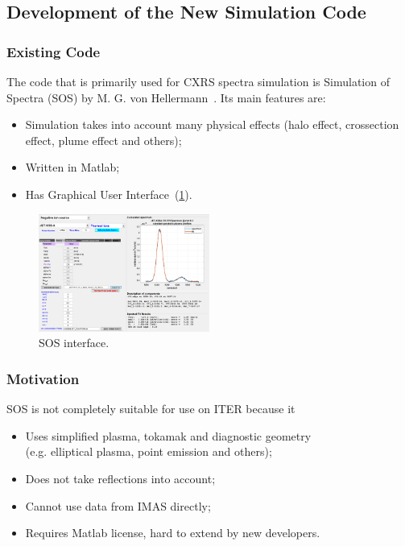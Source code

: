 \documentclass[../main.tex]{subfiles}
\begin{document}

\subsection{Development of the New Simulation Code}

\subsubsection{Existing Code}

The code that is primarily used for CXRS spectra simulation is Simulation of Spectra (SOS) by M. G. von Hellermann~\cite{sos}. Its main features are:

\begin{itemize}
    \item Simulation takes into account many physical effects (halo effect, crossection effect, plume effect and others);
    \item Written in Matlab;
    \item Has Graphical User Interface~(\cref{fig:sos_interface}).
\end{itemize}

\begin{figure}[h!tbp]
    \centering
    \includegraphics[width=0.5\textwidth]{images/sos_interface}
    \caption{SOS interface.}%
    \label{fig:sos_interface}
\end{figure}

\subsubsection{Motivation}

SOS is not completely suitable for use on ITER because it
\begin{itemize}
    \item Uses simplified plasma, tokamak and diagnostic geometry \\
          (e.g. elliptical plasma, point emission and others);
    \item Does not take reflections into account;
    \item Cannot use data from IMAS directly;
    \item Requires Matlab license, hard to extend by new developers.
\end{itemize}
\end{document}
